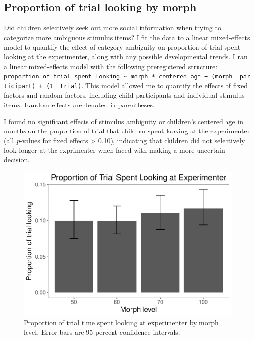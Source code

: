 \documentclass[floatsintext,man]{apa6}
\theoremstyle{definition}
\theoremstyle{definition}
\theoremstyle{definition}
\theoremstyle{remark}
\begin{document}
\subsection{Proportion of trial looking by
morph}\label{proportion-of-trial-looking-by-morph}

Did children selectively seek out more social information when trying to
categorize more ambiguous stimulus items? I fit the data to a linear
mixed-effects model to quantify the effect of category ambiguity on
proportion of trial spent looking at the experimenter, along with any
possible developmental trends. I ran a linear mixed-effects model with
the following preregistered structure:
\texttt{proportion\ of\ trial\ spent\ looking\ \textasciitilde{}\ morph\ *\ centered\ age\ +\ (morph\ \textbar{}\ participant)\ +\ (1\ \textbar{}\ trial)}.
This model allowed me to quantify the effects of fixed factors and
random factors, including child participants and individual stimulus
items. Random effects are denoted in parentheses.

I found no significant effects of stimulus ambiguity or children's
centered age in months on the proportion of trial that children spent
looking at the experimenter (all \emph{p}-values for fixed effects
\textgreater{} 0.10), indicating that children did not selectively look
longer at the exprimenter when faced with making a more uncertain
decision.

\begin{figure}
\centering
\includegraphics{soc_ref_category_paper_files/figure-latex/morphlooking-1.pdf}
\caption{\label{fig:morphlooking}Proportion of trial time spent looking at
experimenter by morph level. Error bars are 95 percent confidence
intervals.}
\end{figure}
\end{document}
